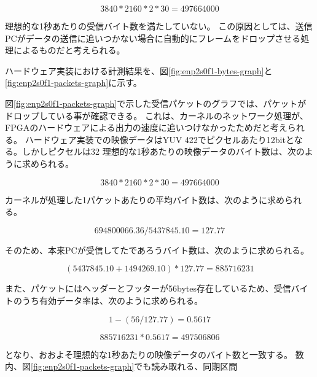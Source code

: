 \[ 3840 * 2160 * 2 * 30 = 497664000 \]

理想的な1秒あたりの受信バイト数を満たしていない。
この原因としては、送信PCがデータの送信に追いつかない場合に自動的にフレームをドロップさせる処理によるものだと考えられる。

ハードウェア実装における計測結果を、図\ref{fig:enp2s0f1-bytes-graph}と\ref{fig:enp2s0f1-packets-graph}に示す。

図\ref{fig:enp2s0f1-packets-graph}で示した受信パケットのグラフでは、パケットがドロップしている事が確認できる。
これは、カーネルのネットワーク処理が、FPGAのハードウェアによる出力の速度に追いつけなかったためだと考えられる。
ハードウェア実装での映像データはYUV 422でピクセルあたり12bitとなる。しかしピクセルは32
理想的な1秒あたりの映像データのバイト数は、次のように求められる。

\[ 3840 * 2160 * 2 * 30 = 497664000 \]

カーネルが処理した1パケットあたりの平均バイト数は、次のように求められる。

\[ 694800066.36 / 5437845.10 = 127.77 \]

そのため、本来PCが受信してたであろうバイト数は、次のように求められる。

\[ (5437845.10 + 1494269.10) * 127.77 = 885716231 \]

また、パケットにはヘッダーとフッターが56bytes存在しているため、受信バイトのうち有効データ率は、次のように求められる。

\[ 1-(56/127.77) = 0.5617 \]

\[ 885716231 * 0.5617 = 497506806 \]

となり、おおよそ理想的な1秒あたりの映像データのバイト数と一致する。
数内、図\ref{fig:enp2s0f1-packets-graph}でも読み取れる、同期区間

%




%
%
%
%

